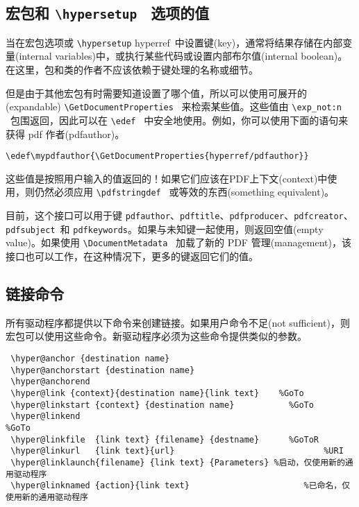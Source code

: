 \documentclass{article}
\newcommand*{\cs}[1]{%
  \texttt{\textbackslash #1}%
}
\newcommand*{\xpackage}[1]{\textsf{#1}}
\begin{document}
\subsection[宏包和 \cs{hypersetup}\ 选项的值]{{\heiti 宏包和} \cs{hypersetup}\ {\heiti 选项的值}}
\marginpar{\footnotesize \heiti \color{spot}{7.00s版本新增}}当在宏包选项或 \cs{hypersetup} \xpackage{hyperref}\ 中设置键(key)，通常将结果存储在内部变量(internal variables)中，或执行某些代码或设置内部布尔值(internal boolean)。在这里，包和类的作者{\kaiti 不应该}依赖于键处理的名称或细节。

但是由于其他宏包有时需要知道设置了哪个值，所以可以使用可展开的(expandable) \cs{GetDocumentProperties}\ 来检索某些值。这些值由 \cs{exp\_not:n}\ 包围返回，因此可以在 \cs{edef}\ 中安全地使用。例如，你可以使用下面的语句来获得 pdf 作者(pdfauthor)。

\begin{verbatim}
\edef\mypdfauthor{\GetDocumentProperties{hyperref/pdfauthor}}
\end{verbatim}

这些值是按照用户输入的值返回的！如果它们应该在PDF上下文(context)中使用，则仍然必须应用 \cs{pdfstringdef}\ 或等效的东西(something equivalent)。

目前，这个接口可以用于键 \texttt{pdfauthor}、\texttt{pdftitle}、\texttt{pdfproducer}、\texttt{pdfcreator}、\texttt{pdfsubject}\ 和 \texttt{pdfkeywords}。如果与未知键一起使用，则返回空值(empty value)。如果使用 \cs{DocumentMetadata}\ 加载了新的 PDF 管理(management)，该接口也可以工作，在这种情况下，更多的键返回它们的值。


\subsection[链接命令]{\heiti 链接命令}
所有驱动程序都提供以下命令来创建链接。如果用户命令不足(not sufficient)，则宏包可以使用这些命令。新驱动程序必须为这些命令提供类似的参数。

\begin{verbatim}
 \hyper@anchor {destination name}
 \hyper@anchorstart {destination name}
 \hyper@anchorend
 \hyper@link {context}{destination name}{link text}    %GoTo
 \hyper@linkstart {context} {destination name}           %GoTo
 \hyper@linkend                                                     %GoTo
 \hyper@linkfile  {link text} {filename} {destname}      %GoToR
 \hyper@linkurl   {link text}{url}                              %URI
 \hyper@linklaunch{filename} {link text} {Parameters} %启动，仅使用新的通用驱动程序
 \hyper@linknamed {action}{link text}                       %已命名，仅使用新的通用驱动程序
\end{verbatim}
\end{document}
